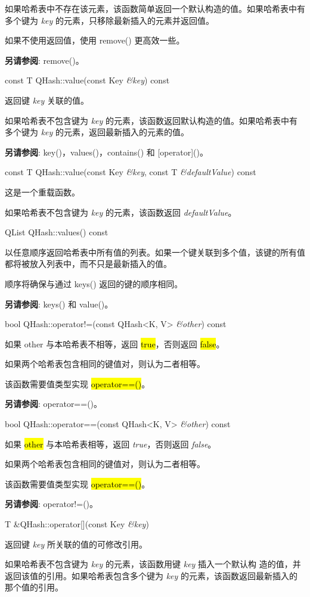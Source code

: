 如果哈希表中不存在该元素，该函数简单返回一个默认构造的值。如果哈希表中有多个键为 \emph{key} 的元素，只移除最新插入的元素并返回值。

如果不使用返回值，使用 remove() 更高效一些。

\textbf{另请参阅}: remove()。

const T QHash::value(const Key \emph{\&key}) const

返回键 \emph{key} 关联的值。

如果哈希表不包含键为 \emph{key} 的元素，该函数返回默认构造的值。如果哈希表中有多个键为 \emph{key} 的元素，返回最新插入的元素的值。

\textbf{另请参阅}: key()，values()，contains() 和 [operator]()。

const T QHash::value(const Key \emph{\&key}, const T \emph{\&defaultValue}) const

这是一个重载函数。

如果哈希表不包含键为 \emph{key} 的元素，该函数返回 \emph{defaultValue}。

QList QHash::values() const

以任意顺序返回哈希表中所有值的列表。如果一个键关联到多个值，该键的所有值都将被放入列表中，而不只是最新插入的值。

顺序将确保与通过 keys() 返回的键的顺序相同。

\textbf{另请参阅}: keys() 和 value()。

bool QHash::operator!=(const QHash<K, V> \emph{\&other}) const

如果 other 与本哈希表不相等，返回 \hl{true}，否则返回 \hl{false}。

如果两个哈希表包含相同的键值对，则认为二者相等。

该函数需要值类型实现 \hl{operator==()}。

\textbf{另请参阅}: operator==()。

bool QHash::operator==(const QHash<K, V> \emph{\&other}) const

如果 \hl{other} 与本哈希表相等，返回 \emph{true}，否则返回 \emph{false}。

如果两个哈希表包含相同的键值对，则认为二者相等。

该函数需要值类型实现 \hl{operator==()}。

\textbf{另请参阅}: operator!=()。

T \&QHash::operator[](const Key \emph{\&key})

返回键 \emph{key} 所关联的值的可修改引用。

如果哈希表不包含键为 \emph{key} 的元素，该函数用键 \emph{key} 插入一个默认构
造的值，并返回该值的引用。如果哈希表包含多个键为 \emph{key} 的元素，该函数返回最新插入的那个值的引用。


